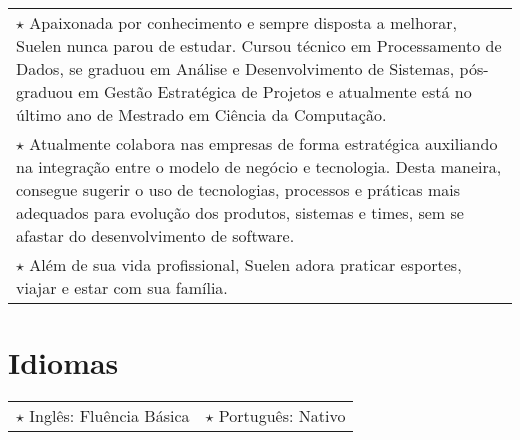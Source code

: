 \documentclass[a4paper, oneside, final]{scrartcl}
\newcommand{\vspc}{\vspace{0.15cm}} %
\begin{document}
\begin{center}
\begin{tabularx}{1\linewidth}{X}
	$\star$ Apaixonada por conhecimento e sempre disposta a melhorar, Suelen nunca parou de estudar. Cursou técnico em Processamento de Dados, se graduou em Análise e Desenvolvimento de Sistemas, pós-graduou em Gestão Estratégica de Projetos e atualmente está no último ano de Mestrado em Ciência da Computação. \vspc\\

	$\star$ Atualmente colabora nas empresas de forma estratégica auxiliando na integração entre o modelo de negócio e tecnologia. Desta maneira, consegue sugerir o uso de tecnologias, processos e práticas mais adequados para evolução dos produtos, sistemas e times, sem se afastar do desenvolvimento de software. \vspc\\

	$\star$ Além de sua vida profissional, Suelen adora praticar esportes, viajar e estar com sua família. \vspc\\

	
	
	
	
\end{tabularx}

\section{Idiomas}
\begin{tabularx}{1\linewidth}{p{6cm}X}
$\star$ Inglês: Fluência Básica & $\star$ Português: Nativo\\
\end{tabularx}



\end{center}
\end{document}
